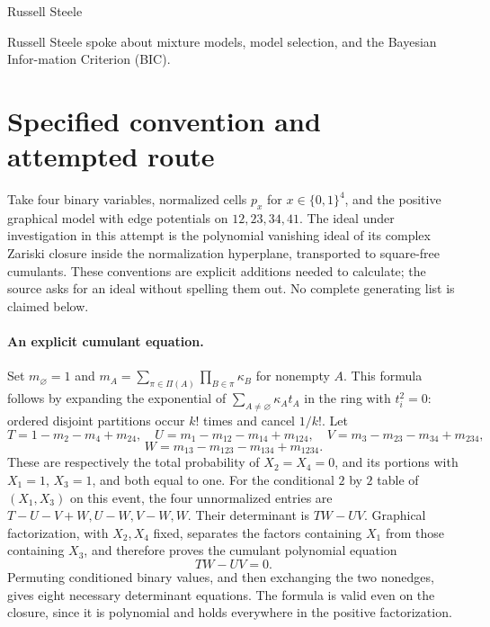 \documentclass[11pt]{article}
\begin{document}
Russell Steele

Russell Steele spoke about mixture models, model selection, and the Bayesian Infor-mation Criterion (BIC).

\section{Specified convention and attempted route}
Take four binary variables, normalized cells $p_x$ for $x\in\{0,1\}^4$,
and the positive graphical model with edge potentials on
$12,23,34,41$. The ideal under investigation in this attempt is the
polynomial vanishing ideal of its complex Zariski closure inside the
normalization hyperplane, transported to square-free cumulants. These
conventions are explicit additions needed to calculate; the source asks
for an ideal without spelling them out. No complete generating list is
claimed below.

\paragraph{An explicit cumulant equation.}
Set $m_\varnothing=1$ and
$m_A=\sum_{\pi\in\Pi(A)}\prod_{B\in\pi}\kappa_B$ for nonempty $A$.
This formula follows by expanding the exponential of
$\sum_{A\ne\varnothing}\kappa_A t_A$ in the ring with $t_i^2=0$:
ordered disjoint partitions occur $k!$ times and cancel $1/k!$.
Let
\[
T=1-m_2-m_4+m_{24},\quad U=m_1-m_{12}-m_{14}+m_{124},
\quad V=m_3-m_{23}-m_{34}+m_{234},
\]
\[
W=m_{13}-m_{123}-m_{134}+m_{1234}.
\]
These are respectively the total probability of $X_2=X_4=0$, and
its portions with $X_1=1$, $X_3=1$, and both equal to one.
For the conditional $2$ by $2$ table of $(X_1,X_3)$ on this event,
the four unnormalized entries are $T-U-V+W,U-W,V-W,W$.
Their determinant is $TW-UV$. Graphical factorization, with $X_2,X_4$
fixed, separates the factors containing $X_1$ from those containing
$X_3$, and therefore proves the cumulant polynomial equation
\[
TW-UV=0.
\]
Permuting conditioned binary values, and then exchanging the two
nonedges, gives eight necessary determinant equations. The formula is
valid even on the closure, since it is polynomial and holds everywhere
in the positive factorization.
\end{document}
